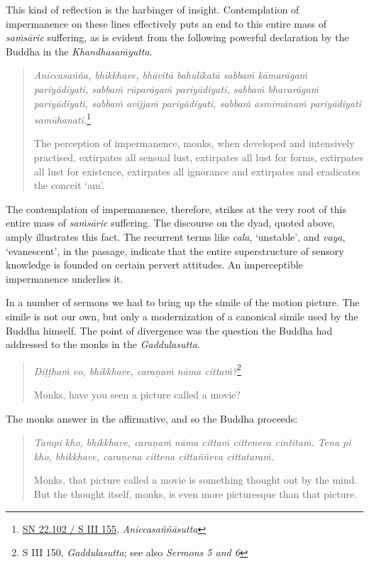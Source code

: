 This kind of reflection is the harbinger of insight. Contemplation of impermanence on these lines effectively puts an end to this entire mass of \emph{saṁsāric} suffering, as is evident from the following powerful declaration by the Buddha in the \emph{Khandhasaṁyutta}.

\begin{quote}
\emph{Aniccasañña, bhikkhave, bhāvitā bahulīkatā sabbaṁ kāmarāgaṁ pariyādiyati, sabbaṁ rūparāgaṁ pariyādiyati, sabbaṁ bhavarāgaṁ pariyādiyati, sabbaṁ avijjaṁ pariyādiyati, sabbaṁ asmimānaṁ pariyādiyati samūhanati.}\footnote{\href{https://suttacentral.net/sn22.102/pli/ms}{SN 22.102 / S III 155}, \emph{Aniccasaññāsutta}}

The perception of impermanence, monks, when developed and intensively practised, extirpates all sensual lust, extirpates all lust for forms, extirpates all lust for existence, extirpates all ignorance and extirpates and eradicates the conceit `am'.
\end{quote}

The contemplation of impermanence, therefore, strikes at the very root of this entire mass of \emph{saṁsāric} suffering. The discourse on the dyad, quoted above, amply illustrates this fact. The recurrent terms like \emph{cala}, `unstable', and \emph{vaya}, `evanescent', in the passage, indicate that the entire superstructure of sensory knowledge is founded on certain pervert attitudes. An imperceptible impermanence underlies it.

In a number of sermons we had to bring up the simile of the motion picture. The simile is not our own, but only a modernization of a canonical simile used by the Buddha himself. The point of divergence was the question the Buddha had addressed to the monks in the \emph{Gaddulasutta}.

\begin{quote}
\emph{Diṭṭhaṁ vo, bhikkhave, caraṇaṁ nāma cittaṁ?}\footnote{S III 150, \emph{Gaddulasutta}; see also \emph{Sermons 5 and 6}}

Monks, have you seen a picture called a movie?
\end{quote}

The monks answer in the affirmative, and so the Buddha proceeds:

\begin{quote}
\emph{Tampi kho, bhikkhave, caraṇaṁ nāma cittaṁ citteneva cintitaṁ. Tena pi kho, bhikkhave, caraṇena cittena cittaññeva cittataraṁ.}

Monks, that picture called a movie is something thought out by the mind. But the thought itself, monks, is even more picturesque than that picture.
\end{quote}

